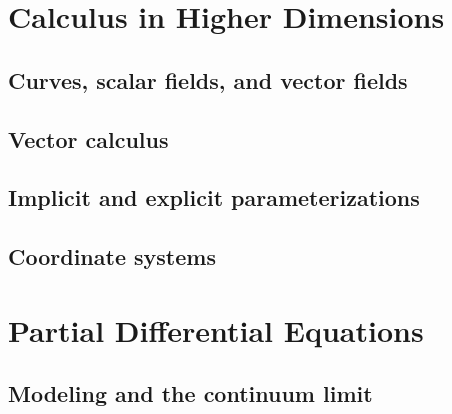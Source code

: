 \documentclass[12pt,letterpaper, openany, oneside]{book}
\begin{document}
 
\frontmatter



%
 
\clearpage
\thispagestyle{empty}
 
\tableofcontents
 
\mainmatter

\setcounter{part}{4}

\part{Calculus in Higher Dimensions}

\chapter{Curves, scalar fields, and vector fields}


\chapter{Vector calculus}


\chapter{Implicit and explicit parameterizations}


\chapter{Coordinate systems}



\part{Partial Differential Equations}

\chapter{Modeling and the continuum limit}

\end{document}
